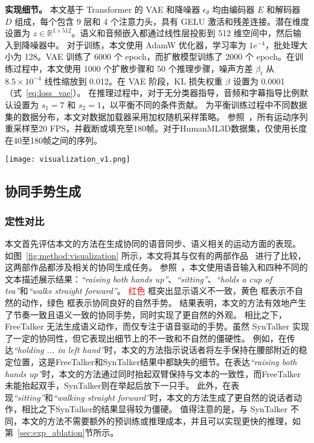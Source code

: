 \textbf{实现细节。}
本文基于 Transformer 的 VAE 和降噪器 $\epsilon_\theta$ 均由编码器 $E$ 和解码器 $D$ 组成，每个包含 9 层和 4 个注意力头，具有 GELU 激活和残差连接。潜在维度设置为 $z \in \mathbb{R}^{1 \times 512}$。语义和音频嵌入都通过线性层投影到 512 维空间中，然后输入到降噪器中。
对于训练，本文使用 AdamW 优化器，学习率为 $1e^{-4}$，批处理大小为 128。VAE 训练了 6000 个 epoch，而扩散模型训练了 2000 个 epoch。在训练过程中，本文使用 1000 个扩散步骤和 50 个推理步骤，噪声方差 $\beta_t$ 从 $8.5 \times 10^{-4}$ 线性缩放到 0.012。在 VAE 阶段，KL 损失权重 $\beta$ 设置为 0.0001（式~\eqref{eq:loss_vae}）。
在推理过程中，对于无分类器指导，音频和字幕指导比例默认设置为 $s_1=7$ 和 $s_2=1$，以平衡不同的条件贡献。
为平衡训练过程中不同数据集的数据分布，本文对数据加载器采用加权随机采样策略。
参照~\cite{yang2024freetalker}，所有运动序列重采样至20 FPS，并截断或填充至180帧。对于HumanML3D数据集，仅使用长度在40至180帧之间的序列。

\begin{figure*}[t]
  \centering
  \texttt{[image: visualization\_v1.png]}
  \caption{协同手势生成的定性比较。}%
  \label{fig:method:visualization}
\end{figure*}

\subsection{协同手势生成}
\subsubsection{定性对比}
本文首先评估本文的方法在生成协同的语音同步、语义相关的运动方面的表现。
如图~\ref{fig:method:visualization} 所示，本文将其与仅有的两部作品~\cite{yang2024freetalker,chen2024syntalker} 进行了比较，这两部作品都涉及相关的协同生成任务。
参照~\cite{chen2024syntalker}，本文使用语音输入和四种不同的文本描述展示结果：\textit{``raising both hands up''}、\textit{``sitting''}、\textit{``holds a cup of tea''}和\textit{``walks straight forward''}。 \textcolor{red}{红色} 框突出显示语义不一致，\textcolor[RGB]{204,153,0}{黄色} 框表示不自然的动作，\textcolor[RGB]{34,139,34}{绿色} 框表示协同良好的自然手势。
结果表明，本文的方法有效地产生了节奏一致且语义一致的协同手势，同时实现了更自然的外观。
相比之下，FreeTalker 无法生成语义动作，而仅专注于语音驱动的手势。虽然 SynTalker 实现了一定的协同性，但它表现出细节上的不一致和不自然的僵硬性。
例如，在传达\textit{``holding ... in left hand''}时，本文的方法指示说话者将左手保持在腰部附近的稳定位置，这是FreeTalker和SynTalker结果中都缺失的细节。在表达\textit{``raising both hands up''}时，本文的方法通过同时抬起双臂保持与文本的一致性，而FreeTalker未能抬起双手，SynTalker则在举起后放下一只手。
此外，在表现\textit{``sitting''}和\textit{``walking straight forward''}时，本文的方法生成了更自然的说话者动作，相比之下SynTalker的结果显得较为僵硬。
值得注意的是，与 SynTalker 不同，本文的方法不需要额外的预训练或推理成本，并且可以实现更快的推理，如第~\ref{sec:exp_ablation}节所示。



